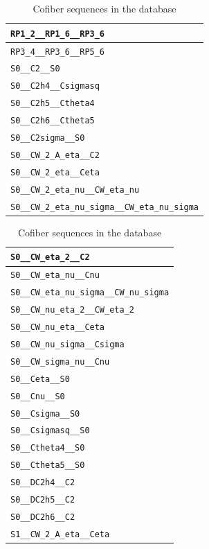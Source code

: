 \documentclass{amsart}
\numberwithin{equation}{section}
\begin{document}
\begin{table}
\begin{tabular}{|l|}
\verb|RP1_2__RP1_6__RP3_6|\\\hline
\verb|RP3_4__RP3_6__RP5_6|\\\hline
\verb|S0__C2__S0|\\\hline
\verb|S0__C2h4__Csigmasq|\\\hline
\verb|S0__C2h5__Ctheta4|\\\hline
\verb|S0__C2h6__Ctheta5|\\\hline
\verb|S0__C2sigma__S0|\\\hline
\verb|S0__CW_2_A_eta__C2|\\\hline
\verb|S0__CW_2_eta__Ceta|\\\hline
\verb|S0__CW_2_eta_nu__CW_eta_nu|\\\hline
\verb|S0__CW_2_eta_nu_sigma__CW_eta_nu_sigma|\\\hline
\end{tabular}\caption{Cofiber sequences in the database}\label{tb1:cofseq}
\end{table}\vspace{5pt}
\begin{table}
\begin{tabular}{|l|}\hline
\verb|S0__CW_eta_2__C2|\\\hline
\verb|S0__CW_eta_nu__Cnu|\\\hline
\verb|S0__CW_eta_nu_sigma__CW_nu_sigma|\\\hline
\verb|S0__CW_nu_eta_2__CW_eta_2|\\\hline
\verb|S0__CW_nu_eta__Ceta|\\\hline
\verb|S0__CW_nu_sigma__Csigma|\\\hline
\verb|S0__CW_sigma_nu__Cnu|\\\hline
\verb|S0__Ceta__S0|\\\hline
\verb|S0__Cnu__S0|\\\hline
\verb|S0__Csigma__S0|\\\hline
\verb|S0__Csigmasq__S0|\\\hline
\verb|S0__Ctheta4__S0|\\\hline
\verb|S0__Ctheta5__S0|\\\hline
\verb|S0__DC2h4__C2|\\\hline
\verb|S0__DC2h5__C2|\\\hline
\verb|S0__DC2h6__C2|\\\hline
\verb|S1__CW_2_A_eta__Ceta|\\\hline
\end{tabular}\caption{Cofiber sequences in the database}\label{tb2:cofseq}
\end{table}\vspace{5pt}
\end{document}
